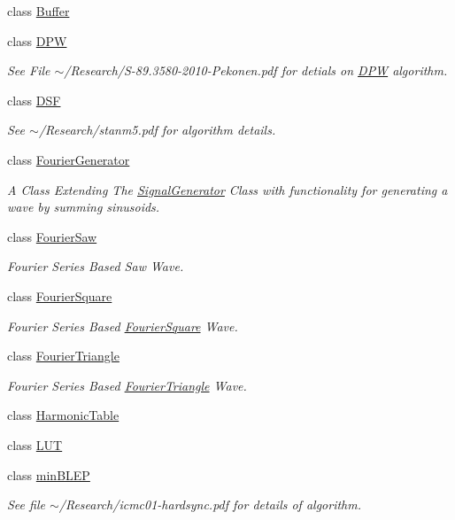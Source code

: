 \begin{DoxyCompactItemize}
class \hyperlink{classDSG_1_1Buffer}{Buffer}
\item 
class \hyperlink{classDSG_1_1DPW}{D\+P\+W}
\begin{DoxyCompactList}\small\item\em See File $\sim$/\+Research/\+S-\/89.3580-\/2010-\/\+Pekonen.\+pdf for detials on \hyperlink{classDSG_1_1DPW}{D\+P\+W} algorithm. \end{DoxyCompactList}\item 
class \hyperlink{classDSG_1_1DSF}{D\+S\+F}
\begin{DoxyCompactList}\small\item\em See $\sim$/\+Research/stanm5.pdf for algorithm details. \end{DoxyCompactList}\item 
class \hyperlink{classDSG_1_1FourierGenerator}{Fourier\+Generator}
\begin{DoxyCompactList}\small\item\em A Class Extending The \hyperlink{classDSG_1_1SignalGenerator}{Signal\+Generator} Class with functionality for generating a wave by summing sinusoids. \end{DoxyCompactList}\item 
class \hyperlink{classDSG_1_1FourierSaw}{Fourier\+Saw}
\begin{DoxyCompactList}\small\item\em Fourier Series Based Saw Wave. \end{DoxyCompactList}\item 
class \hyperlink{classDSG_1_1FourierSquare}{Fourier\+Square}
\begin{DoxyCompactList}\small\item\em Fourier Series Based \hyperlink{classDSG_1_1FourierSquare}{Fourier\+Square} Wave. \end{DoxyCompactList}\item 
class \hyperlink{classDSG_1_1FourierTriangle}{Fourier\+Triangle}
\begin{DoxyCompactList}\small\item\em Fourier Series Based \hyperlink{classDSG_1_1FourierTriangle}{Fourier\+Triangle} Wave. \end{DoxyCompactList}\item 
class \hyperlink{classDSG_1_1HarmonicTable}{Harmonic\+Table}
\item 
class \hyperlink{classDSG_1_1LUT}{L\+U\+T}
\item 
class \hyperlink{classDSG_1_1minBLEP}{min\+B\+L\+E\+P}
\begin{DoxyCompactList}\small\item\em See file $\sim$/\+Research/icmc01-\/hardsync.pdf for details of algorithm. \end{DoxyCompactList}\item 

\end{DoxyCompactItemize}
